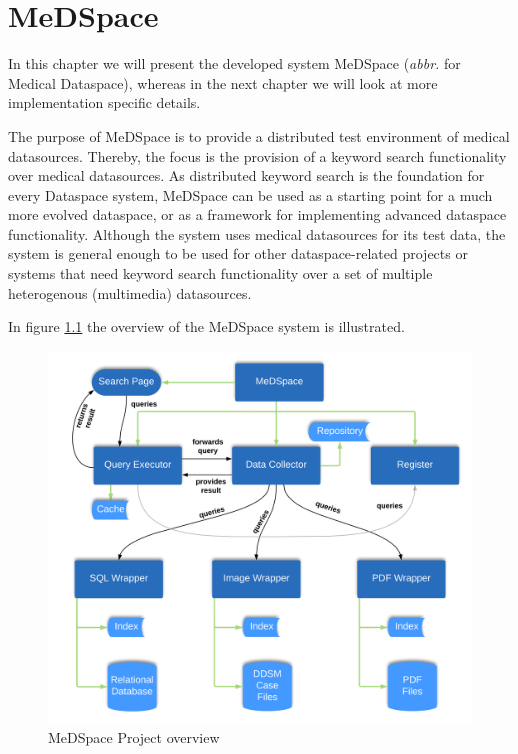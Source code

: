 \chapter{MeDSpace}

In this chapter we will present the developed system MeDSpace (\textit{abbr.} for Medical Dataspace), whereas in the next chapter we will look at more implementation specific details.

The purpose of MeDSpace is to provide a distributed test environment of medical datasources. Thereby, the focus is the provision of a keyword search functionality over medical datasources. 
As distributed keyword search is the foundation for every Dataspace system, MeDSpace can be used as a starting point for a much more evolved dataspace, or as a framework for implementing advanced dataspace functionality.
Although the system uses medical datasources for its test data, the system is general enough to be used for other dataspace-related projects or systems that need keyword search functionality over a set of multiple heterogenous (multimedia) datasources. 

In figure \ref{MeDSpaceOverview} the overview of the MeDSpace system is illustrated.
\begin{figure}[H]
	\begin{center}
		\includegraphics[scale=0.145]{figures/MeDSpace-Overview.png}
	\end{center}
	\caption{MeDSpace Project overview}
	\label{MeDSpaceOverview}
\end{figure} 

